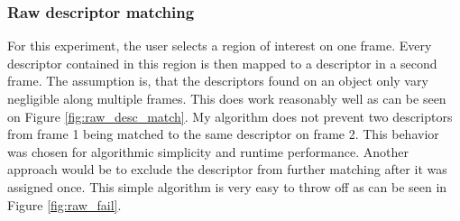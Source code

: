 \documentclass{paper}
\begin{document}
\subsubsection{Raw descriptor matching}
\label{sec:raw}
For this experiment, the user selects a region of interest on one frame. Every 
descriptor contained in this region is then mapped to a descriptor in a second frame.
The assumption is, that the descriptors found on an object only vary negligible along
multiple frames. This does work reasonably well as can be seen
on Figure \ref{fig:raw_desc_match}. My algorithm does not prevent two descriptors from
frame 1 being matched to the same descriptor on frame 2. This behavior was chosen for
 algorithmic simplicity and runtime performance. Another approach would be to exclude 
the descriptor from further matching after it was assigned once.
This simple algorithm is very easy to throw off as can be seen in Figure \ref{fig:raw_fail}.
\end{document}
